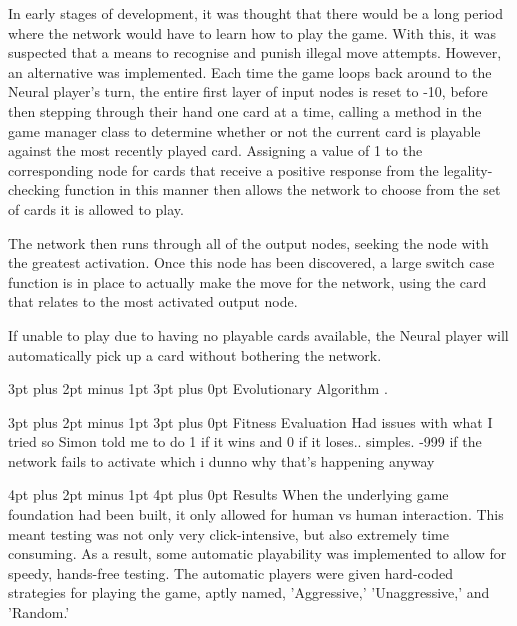 \documentclass[12pt,a4paper]{article}
\makeatletter
\renewcommand\subsection{\@startsection {subsection}{1}{2mm} %
                               {3pt plus 2pt minus 1pt} %
                               {3pt plus 0pt} %
                               {\normalfont\bfseries}}
\renewcommand\section{\@startsection {section}{1}{0mm} %
                               {4pt plus 2pt minus 1pt} %
                               {4pt plus 0pt} %
                               {\bfseries}}
\makeatother
\begin{document}
In early stages of development, it was thought that there would be a long period where the network would have to learn how to play the game. With this, it was suspected that a means to recognise and punish illegal move attempts. However, an alternative was implemented. Each time the game loops back around to the Neural player's turn, the entire first layer of input nodes is reset to -10, before then stepping through their hand one card at a time, calling a method in the game manager class to determine whether or not the current card is playable against the most recently played card. Assigning a value of 1 to the corresponding node for cards that receive a positive response from the legality-checking function in this manner then allows the network to choose from the set of cards it is allowed to play.

The network then runs through all of the output nodes, seeking the node with the greatest activation. Once this node has been discovered, a large switch case function is in place to actually make the move for the network, using the card that relates to the most activated output node. 

If unable to play due to having no playable cards available, the Neural player will automatically pick up a card without bothering the network. 


\subsection{Evolutionary Algorithm}
.

\subsection{Fitness Evaluation}
Had issues with what I tried so Simon told me to do 1 if it wins and 0 if it loses.. simples. -999 if the network fails to activate which i dunno why that's happening anyway


\newpage
\section{Results}
When the underlying game foundation had been built, it only allowed for human vs human interaction. This meant testing was not only very click-intensive, but also extremely time consuming. As a result, some automatic playability was implemented to allow for speedy, hands-free testing. The automatic players were given hard-coded strategies for playing the game, aptly named, 'Aggressive,' 'Unaggressive,' and 'Random.' 
\end{document}
